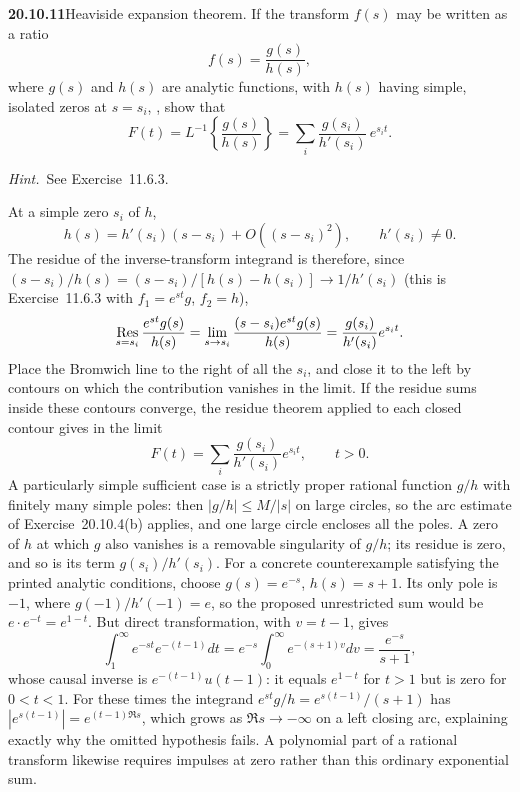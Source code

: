 \par\bigskip
\noindent\textbf{20.10.11}\quad Heaviside expansion theorem. If
the transform $f(s)$ may be written as a ratio
\[
f(s)=\frac{g(s)}{h(s)},
\]
where $g(s)$ and $h(s)$ are analytic functions, with $h(s)$
having simple, isolated zeros at $s=s_i$,
, show that
\[
F(t)=L^{-1}\left\{\frac{g(s)}{h(s)}\right\}
=\sum_{i}\frac{g(s_{i})}{h'(s_{i})}\,e^{s_{i}t}.
\]
\par\emph{Hint.}~See Exercise~11.6.3.
\par{}
\solution
At a simple zero $s_i$ of $h$,
\[
h(s)=h'(s_i)(s-s_i)+O((s-s_i)^2),\qquad h'(s_i)\ne0.
\]
The residue of the inverse-transform integrand is therefore,
since $(s-s_i)/h(s)=(s-s_i)/[h(s)-h(s_i)]\to1/h'(s_i)$
(this is Exercise~11.6.3 with $f_1=e^{st}g$, $f_2=h$),
\[
\mathop{\rm Res}_{s=s_i}\frac{e^{st}g(s)}{h(s)}
=\lim_{s\to s_i}\frac{(s-s_i)e^{st}g(s)}{h(s)}
=\frac{g(s_i)}{h'(s_i)}e^{s_it}.
\]
Place the Bromwich line to the right of all the $s_i$, and
close it to the left by contours on which the contribution
vanishes in the limit. If the residue sums inside these
contours converge, the residue theorem applied to each closed
contour gives in the limit
\[
\boxed{F(t)=\sum_i\frac{g(s_i)}{h'(s_i)}e^{s_it}},\qquad t>0.
\]
A particularly simple sufficient case is a strictly proper
rational function $g/h$ with finitely many simple poles: then
$|g/h|\le M/|s|$ on large circles, so the arc estimate of
Exercise~20.10.4(b) applies, and one large circle encloses all
the poles. A zero of $h$ at which $g$ also vanishes is a
removable singularity of $g/h$; its residue is zero, and so is
its term $g(s_i)/h'(s_i)$.
For a concrete counterexample satisfying the printed analytic
conditions, choose $g(s)=e^{-s}$, $h(s)=s+1$. Its only pole
is $-1$, where $g(-1)/h'(-1)=e$, so the proposed unrestricted
sum would be $e\cdot e^{-t}=e^{1-t}$. But direct
transformation, with $v=t-1$, gives
\[
\int_1^\infty e^{-st}e^{-(t-1)}dt
=e^{-s}\int_0^\infty e^{-(s+1)v}dv=\frac{e^{-s}}{s+1},
\]
whose causal inverse is $e^{-(t-1)}u(t-1)$: it equals $e^{1-t}$
for $t>1$ but is zero for $0<t<1$.
For these times the integrand $e^{st}g/h=e^{s(t-1)}/(s+1)$ has
$|e^{s(t-1)}|=e^{(t-1)\Re s}$, which grows as $\Re s\to-\infty$
on a left closing arc, explaining exactly why the omitted
hypothesis fails. A polynomial part of a rational transform likewise
requires impulses at zero rather than this ordinary
exponential sum.


